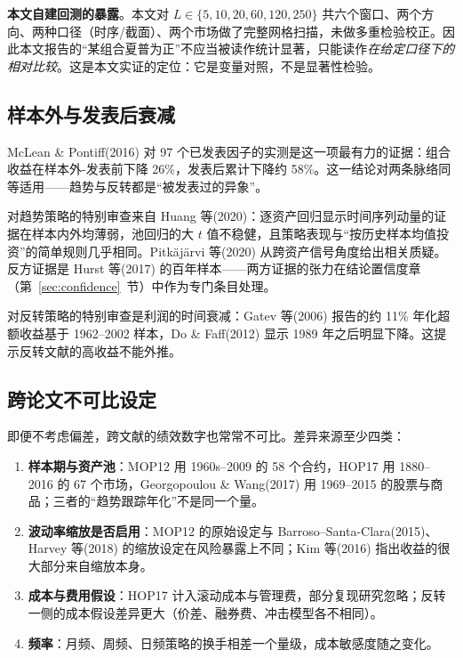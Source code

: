 \textbf{本文自建回测的暴露}。本文对 $L\in\{5,10,20,60,120,250\}$ 共六个窗口、两个方向、两种口径（时序/截面）、两个市场做了完整网格扫描，未做多重检验校正。因此本文报告的“某组合夏普为正”不应当被读作统计显著，只能读作\emph{在给定口径下的相对比较}。这是本文实证的定位：它是变量对照，不是显著性检验。

\subsection{样本外与发表后衰减}

McLean \& Pontiff(2016) 对 97 个已发表因子的实测是这一项最有力的证据：组合收益在样本外-发表前下降 26\%，发表后累计下降约 58\%\cite{mcleanpontiff2016}。这一结论对两条脉络同等适用——趋势与反转都是“被发表过的异象”。

对趋势策略的特别审查来自 Huang 等(2020)：逐资产回归显示时间序列动量的证据在样本内外均薄弱，池回归的大 $t$ 值不稳健，且策略表现与“按历史样本均值投资”的简单规则几乎相同\cite{huang2020}。Pitkäjärvi 等(2020) 从跨资产信号角度给出相关质疑\cite{pitkajarvi2020}。反方证据是 Hurst 等(2017) 的百年样本\cite{hop2017}——两方证据的张力在结论置信度章（第~\ref{sec:confidence}~节）中作为专门条目处理。

对反转策略的特别审查是利润的时间衰减：Gatev 等(2006) 报告的约 11\% 年化超额收益基于 1962--2002 样本\cite{gatev2006}，Do \& Faff(2012) 显示 1989 年之后明显下降\cite{dofaff2012}。这提示反转文献的高收益不能外推。

\subsection{跨论文不可比设定}

即便不考虑偏差，跨文献的绩效数字也常常不可比。差异来源至少四类：

\begin{enumerate}[leftmargin=2.2em]
  \item \textbf{样本期与资产池}：MOP12 用 1960s--2009 的 58 个合约\cite{mop2012}，HOP17 用 1880--2016 的 67 个市场\cite{hop2017}，Georgopoulou \& Wang(2017) 用 1969--2015 的股票与商品\cite{georgopoulou2017}；三者的“趋势跟踪年化”不是同一个量。
  \item \textbf{波动率缩放是否启用}：MOP12 的原始设定与 Barroso--Santa-Clara(2015)、Harvey 等(2018) 的缩放设定在风险暴露上不同\cite{mop2012,barroso2015,harvey2018}；Kim 等(2016) 指出收益的很大部分来自缩放本身\cite{kim2016}。
  \item \textbf{成本与费用假设}：HOP17 计入滚动成本与管理费\cite{hop2017}，部分复现研究忽略；反转一侧的成本假设差异更大（价差、融券费、冲击模型各不相同）\cite{dofaff2012,novymarxvelikov2016}。
  \item \textbf{频率}：月频、周频、日频策略的换手相差一个量级，成本敏感度随之变化\cite{baltaskosowski2011,korajczyksadka2004}。
\end{enumerate}

